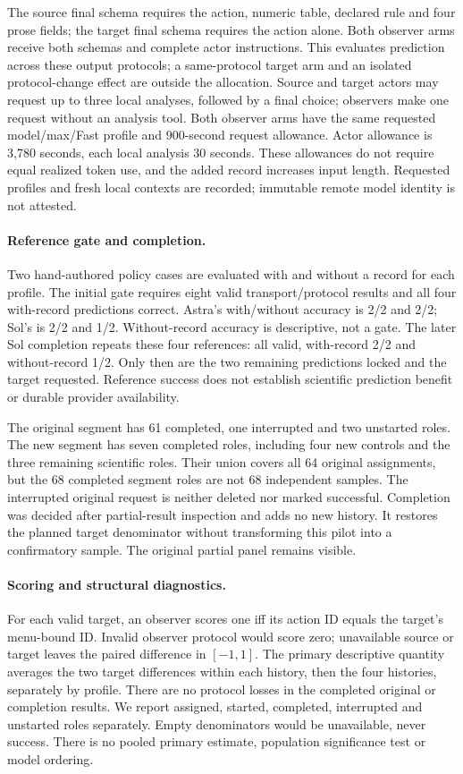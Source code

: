 The source final schema requires the action, numeric table, declared rule
and four prose fields; the target final schema requires the action alone.
Both observer arms receive both schemas and complete actor instructions.
This evaluates prediction across these output protocols; a same-protocol
target arm and an isolated protocol-change effect are outside the allocation.
Source and target actors may request up to three local analyses, followed by
a final choice; observers make one request without an analysis tool. Both
observer arms have the same requested model/max/Fast profile and 900-second
request allowance. Actor allowance is 3,780 seconds, each local analysis
30 seconds. These allowances do not require equal realized token use, and
the added record increases input length. Requested profiles and fresh local
contexts are recorded; immutable remote model identity is not attested.

\paragraph{Reference gate and completion.}
Two hand-authored policy cases are evaluated with and without a record for
each profile. The initial gate requires eight valid transport/protocol results
and all four with-record predictions correct. Astra's with/without accuracy
is 2/2 and 2/2; Sol's is 2/2 and 1/2. Without-record accuracy is descriptive,
not a gate. The later Sol completion repeats these four references: all valid,
with-record 2/2 and without-record 1/2. Only then are the two remaining
predictions locked and the target requested. Reference success does not
establish scientific prediction benefit or durable provider availability.

The original segment has 61 completed, one interrupted and two unstarted
roles. The new segment has seven completed roles, including four new controls
and the three remaining scientific roles. Their union covers all 64 original
assignments, but the 68 completed segment roles are not 68 independent samples.
The interrupted original request is neither deleted nor marked successful.
Completion was decided after partial-result inspection and adds no new
history. It restores the planned target denominator without transforming this
pilot into a confirmatory sample. The original partial panel remains visible.

\paragraph{Scoring and structural diagnostics.}
For each valid target, an observer scores one iff its action ID equals the
target's menu-bound ID. Invalid observer protocol would score zero; unavailable
source or target leaves the paired difference in $[-1,1]$. The primary
descriptive quantity averages the two target differences within each history,
then the four histories, separately by profile. There are no protocol losses
in the completed original or completion results. We report assigned, started,
completed, interrupted and unstarted roles separately. Empty denominators
would be unavailable, never success. There is no pooled primary estimate,
population significance test or model ordering.

